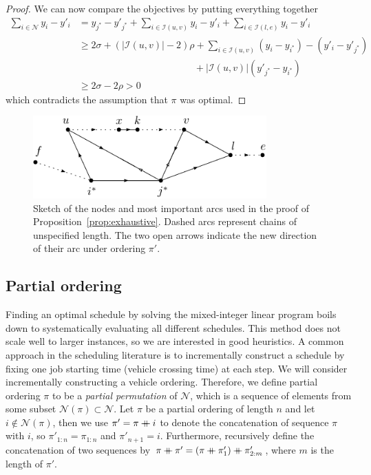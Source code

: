 \documentclass[a4paper]{article}
\newcommand\mdoubleplus{\mathbin{+\mkern-10mu+}}
\theoremstyle{definition}
\theoremstyle{plain}
\begin{document}
\begin{proof}
  We can now compare the objectives by putting everything together
  \begin{align*}
    \sum_{i \in \mathcal{N}} y_{i} - y'_{i} &=  y_{j^{*}} - y'_{j^{*}} + \sum_{i \in \mathcal{I}(u, v)} y_{i} - y'_{i} + \sum_{i \in \mathcal{I}(l, e)} y_{i} - y'_{i} \\
    &\geq 2 \sigma + (|\mathcal{I}(u,v)| - 2) \rho + \sum_{i \in \mathcal{I}(u,v)} (y_{i} - y_{i^{*}}) - (y'_{i} - y'_{j^{*}}) \\ & \hspace{12em} + |\mathcal{I}(u,v)| (y'_{j^{*}} - y_{i^{*}}) \\
    &\geq 2 \sigma - 2 \rho > 0
  \end{align*}
  which contradicts the assumption that $\pi$ was optimal.
\end{proof}

\begin{figure}
  \centering
  \includegraphics[width=0.8\textwidth]{figures/platoon-preservation-proof-diagram.pdf}
  \caption{Sketch of the nodes and most important arcs used in the proof of
    Proposition~\ref{prop:exhaustive}. Dashed arcs represent chains of
    unspecified length. The two open arrows indicate the new direction of their
    arc under ordering $\pi'$.}\label{fig:platoon-preservation-diagram}
\end{figure}


\subsection*{Partial ordering}

Finding an optimal schedule by solving the mixed-integer linear program boils
down to systematically evaluating all different schedules. This method does not
scale well to larger instances, so we are interested in good heuristics. A
common approach in the scheduling literature is to incrementally construct a
schedule by fixing one job starting time (vehicle crossing time) at each step.
%
We will consider incrementally constructing a vehicle ordering. Therefore, we
define partial ordering $\pi$ to be a \textit{partial permutation} of
$\mathcal{N}$, which is a sequence of elements from some subset
$\mathcal{N}(\pi) \subset \mathcal{N}$.
%
Let $\pi$ be a partial ordering of length $n$ and let
$i \notin \mathcal{N}(\pi)$, then we use $\pi' = \pi \mdoubleplus i$ to denote
the concatenation of sequence $\pi$ with $i$, so $\pi'_{1:n} = \pi_{1:n}$ and
$\pi'_{n+1} = i$. Furthermore, recursively define the concatenation of two
sequences by
$\pi \mdoubleplus \pi' = ( \pi \mdoubleplus \pi'_{1} ) \mdoubleplus \pi'_{2:m}$,
where $m$ is the length of $\pi'$.
\end{document}
